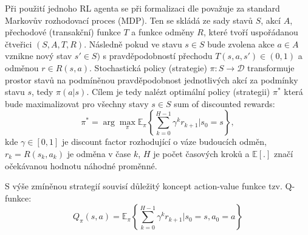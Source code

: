 \documentclass[czech, bc, kky, he, iso690numb]{fasthesis}
\begin{document}
            Při použití jednoho RL agenta se při formalizaci dle \cite{Deep_RL_survey, RLbook} považuje za standard Markovův rozhodovací proces (MDP). Ten se skládá ze sady stavů \(S\), akcí \(A\), přechodové (transakční) funkce \(T\) a funkce odměny \(R\), které tvoří uspořádanou čtveřici \((S, A, T, R)\). Následně pokud ve stavu \(s \in S\) bude zvolena akce \(a \in A\) vznikne nový stav \(s' \in S)\) s pravděpodobností přechodu \(T(s,a,s') \in (0,1)\) a odměnou \(r \in R(s,a)\). Stochastická policy (strategie) \(\pi : S \rightarrow \mathscr{D}\) transformuje prostor stavů na podmíněnou pravděpodobnost jednotlivých akcí za podmínky stavu \(s\), tedy \(\pi(a|s)\). Cílem je tedy nalézt optimální policy (strategii) \(\pi^{*}\) která bude maximalizovat pro všechny stavy \(s \in S\) sum of discounted rewards:
            	\begin{equation}
            		\pi^{*} = \arg \max_{\pi} \mathbb{E}_{\pi} \left\{\sum_{k=0}^{H-1}\gamma^{k}r_{k+1} | s_{0}=s\right\},
            	\end{equation}
            kde \(\gamma \in [0,1]\) je discount factor rozhodující o váze budoucích odměn, \(r_{k}=R(s_{k}, a_{k})\) je odměna v čase \(k\), \(H\) je počet časových kroků a \(\mathbb{E} [.]\) značí očekávanou hodnotu náhodné proměnné.
            
            S výše zmíněnou strategií souvisí důležitý koncept action-value funkce tzv. Q-funkce:
            	\begin{equation}
            		Q_{\pi}(s,a) = \mathbb{E}_{\pi} \left\{\sum_{k=0}^{H-1}\gamma^{k}r_{k+1} | s_{0}=s, a_{0}=a\right\}
            		\label{eqn:Q-function}
            	\end{equation}
\end{document}
